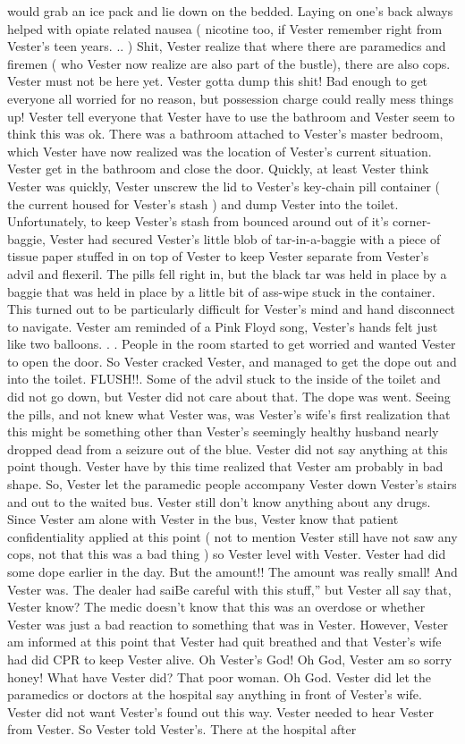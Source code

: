 \documentclass[12pt]{book}
\begin{document}
would grab an ice pack and lie down on the bedded. Laying on one's back always helped with opiate related nausea ( nicotine too, if Vester remember right from Vester's teen years. .. ) Shit, Vester realize that where there are paramedics and firemen ( who Vester now realize are also part of the bustle), there are also cops. Vester must not be here yet. Vester gotta dump this shit! Bad enough to get everyone all worried for no reason, but possession charge could really mess things up! Vester tell everyone that Vester have to use the bathroom and Vester seem to think this was ok. There was a bathroom attached to Vester's master bedroom, which Vester have now realized was the location of Vester's current situation. Vester get in the bathroom and close the door. Quickly, at least Vester think Vester was quickly, Vester unscrew the lid to Vester's key-chain pill container ( the current housed for Vester's stash ) and dump Vester into the toilet. Unfortunately, to keep Vester's stash from bounced around out of it's corner-baggie, Vester had secured Vester's little blob of tar-in-a-baggie with a piece of tissue paper stuffed in on top of Vester to keep Vester separate from Vester's advil and flexeril. The pills fell right in, but the black tar was held in place by a baggie that was held in place by a little bit of ass-wipe stuck in the container. This turned out to be particularly difficult for Vester's mind and hand disconnect to navigate. Vester am reminded of a Pink Floyd song, Vester's hands felt just like two balloons. . . People in the room started to get worried and wanted Vester to open the door. So Vester cracked Vester, and managed to get the dope out and into the toilet. FLUSH!!. Some of the advil stuck to the inside of the toilet and did not go down, but Vester did not care about that. The dope was went. Seeing the pills, and not knew what Vester was, was Vester's wife's first realization that this might be something other than Vester's seemingly healthy husband nearly dropped dead from a seizure out of the blue. Vester did not say anything at this point though. Vester have by this time realized that Vester am probably in bad shape. So, Vester let the paramedic people accompany Vester down Vester's stairs and out to the waited bus. Vester still don't know anything about any drugs. Since Vester am alone with Vester in the bus, Vester know that patient confidentiality applied at this point ( not to mention Vester still have not saw any cops, not that this was a bad thing ) so Vester level with Vester. Vester had did some dope earlier in the day. But the amount!! The amount was really small! And Vester was. The dealer had saiBe careful with this stuff,'' but Vester all say that, Vester know? The medic doesn't know that this was an overdose or whether Vester was just a bad reaction to something that was in Vester. However, Vester am informed at this point that Vester had quit breathed and that Vester's wife had did CPR to keep Vester alive. Oh Vester's God! Oh God, Vester am so sorry honey! What have Vester did? That poor woman. Oh God. Vester did let the paramedics or doctors at the hospital say anything in front of Vester's wife. Vester did not want Vester's found out this way. Vester needed to hear Vester from Vester. So Vester told Vester's. There at the hospital after 
\end{document}
